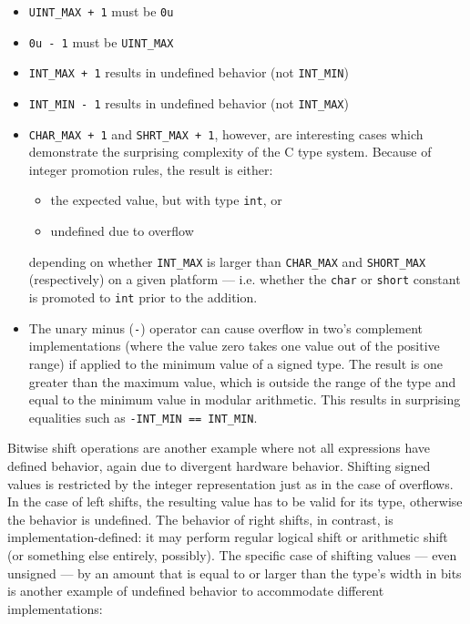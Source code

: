 \begin{itemize}
    \item \texttt{UINT\_MAX + 1} must be \texttt{0u}
    \item \texttt{0u - 1} must be \texttt{UINT\_MAX}
    \item
        \texttt{INT\_MAX + 1} results in undefined behavior (not
        \texttt{INT\_MIN})
    \item
        \texttt{INT\_MIN - 1} results in undefined behavior (not
        \texttt{INT\_MAX})
    \item
        \texttt{CHAR\_MAX + 1} and \texttt{SHRT\_MAX + 1}, however, are
        interesting cases which demonstrate the surprising complexity of the C
        type system.  Because of integer promotion rules, the result is either:
        \begin{itemize}
            \item the expected value, but with type \texttt{int}, or
            \item undefined due to overflow
        \end{itemize}
        depending on whether \texttt{INT\_MAX} is larger than \texttt{CHAR\_MAX}
        and \texttt{SHORT\_MAX} (respectively) on a given platform --- i.e.
        whether the \texttt{char} or \texttt{short} constant is promoted to
        \texttt{int} prior to the addition.
    \item
        The unary minus (\texttt{-}) operator can cause overflow in two's
        complement implementations (where the value zero takes one value out of
        the positive range) if applied to the minimum value of a signed type.
        The result is one greater than the maximum value, which is outside the
        range of the type and equal to the minimum value in modular arithmetic.
        This results in surprising equalities such as \texttt{-INT\_MIN ==
        INT\_MIN}.
\end{itemize}

Bitwise shift operations are another example where not all expressions have
defined behavior, again due to divergent hardware behavior.  Shifting signed
values is restricted by the integer representation just as in the case of
overflows.  In the case of left shifts, the resulting value has to be valid for
its type, otherwise the behavior is undefined.  The behavior of right shifts, in
contrast, is implementation-defined: it may perform regular logical shift or
arithmetic shift (or something else entirely, possibly).  The specific case of
shifting values --- even unsigned --- by an amount that is equal to or larger
than the type's width in bits is another example of undefined behavior to
accommodate different implementations:

